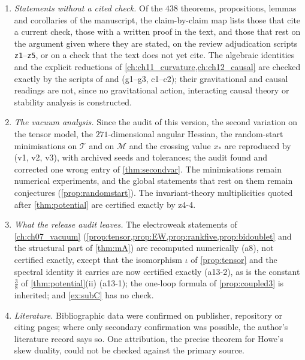 \begin{enumerate}[label=(\roman*),leftmargin=2.2em]
\item \emph{Statements without a cited check.} Of the $438$ theorems, propositions, lemmas and corollaries of the manuscript, the
claim-by-claim map  lists those that cite a current check, those with a written proof in the text, and those
that rest on the argument given where they are stated, on the review adjudication scripts \texttt{z1}--\texttt{z5}, or on a check that the
text does not yet cite. The algebraic identities and the explicit reductions of \cref{ch:ch11_curvature,ch:ch12_causal} are checked exactly by
the scripts of  and  (g1--g3, c1--c2); their gravitational and causal
readings are not, since no gravitational action, interacting causal theory or stability analysis is constructed.
\item \emph{The vacuum analysis.} Since the audit of this version, the second variation on the tensor model, the $271$-dimensional angular
Hessian, the random-start minimisations on $\mathcal T$ and on $\mathcal M$ and the crossing value $x_*$ are reproduced by
 (v1, v2, v3), with archived seeds and tolerances; the audit found and corrected one wrong entry of
\cref{thm:secondvar}. The minimisations remain numerical experiments, and the global statements that rest on them remain conjectures
(\cref{prop:randomstart}). The invariant-theory multiplicities quoted after \cref{thm:potential} are certified exactly by z4-4.
\item \emph{What the release audit leaves.} The electroweak statements of \cref{ch:ch07_vacuum} (\cref{prop:tensor,prop:EW,prop:rankfive,prop:bidoublet}
and the structural part of \cref{thm:mA}) are recomputed numerically (a8), not certified exactly, except that the isomorphism $\iota$ of
\cref{prop:tensor} and the spectral identity it carries are now certified exactly (a13-2), as is the constant $\tfrac38$ of \cref{thm:potential}(ii)
(a13-1); the one-loop formula of
\cref{prop:coupled3} is inherited; and \cref{ex:subC} has no check.
\item \emph{Literature.} Bibliographic data were confirmed on publisher, repository or citing pages; where only secondary confirmation was
possible, the author's literature record says so. One attribution, the precise theorem for Howe's skew duality, could
not be checked against the primary source.
\end{enumerate}


